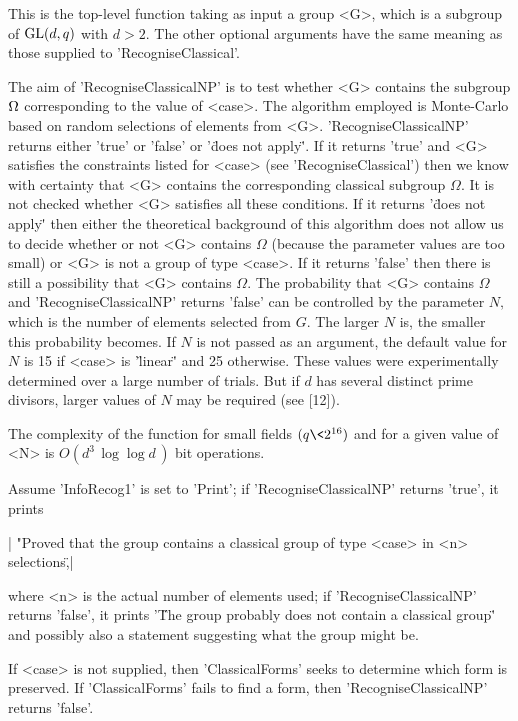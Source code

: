 This is the top-level function taking as input  a  group <G>, which  is a
subgroup of ${\rm GL}(d,q)$ with $d >  2$.  The  other optional arguments have
the same meaning as those supplied to 'RecogniseClassical'.

The aim  of  'RecogniseClassicalNP' is  to test  whether <G> contains the
subgroup  ${\Omega}$  corresponding to  the value  of  <case>.   The  algorithm
employed is Monte-Carlo based on random selections of elements  from <G>.
'RecogniseClassicalNP' returns either 'true'  or 'false' or  '\"does  not
apply\"'.  If it returns 'true' and <G> satisfies  the constraints listed
for <case> (see 'RecogniseClassical')  then we know  with certainty  that
<G>  contains the corresponding classical subgroup  $\Omega$.  It is  not
checked  whether  <G> satisfies all  these  conditions.   If  it  returns
'\"does  not apply\"'  then  either  the theoretical  background of  this
algorithm  does  not  allow  us  to  decide  whether or not <G>  contains
$\Omega$  (because the parameter  values are  too small)  or <G> is not a
group of type  <case>.  If  it  returns  'false'  then there  is still  a
possibility that <G> contains $\Omega.$ The probability that <G> contains
$\Omega$ and 'RecogniseClassicalNP' returns 'false' can be controlled  by
the parameter $N,$ which is the number of elements selected from $G.$ The
larger $N$  is,  the smaller  this  probability becomes.   If $N$ is  not
passed  as  an argument, the default value for $N$  is  15  if  <case> is
'\"linear\"'   and  25  otherwise.   These   values  were  experimentally
determined  over  a  large  number of  trials.   But  if  $d$ has several
distinct prime divisors, larger values of $N$ may be required (see [12]).

The complexity of the function for small fields $(q \< 2^{16})$ and for a
given value of <N> is $O( d^3\, \log\log d\, )$ bit operations.

Assume 'InfoRecog1' is  set to 'Print'; if 'RecogniseClassicalNP' returns
'true', it prints

|    "Proved that the group contains  a classical group of type <case>
    in  <n> selections\",|

where     <n>  is   the    actual    number   of   elements      used; if
'RecogniseClassicalNP' returns 'false', it  prints '\"The group  probably
does not   contain a classical  group\"'  and  possibly  also a statement
suggesting what the group might be.

If <case> is not supplied, then 'ClassicalForms' seeks to determine which
form is   preserved.  If 'ClassicalForms'  fails to  find  a  form,  then
'RecogniseClassicalNP' returns 'false'.

